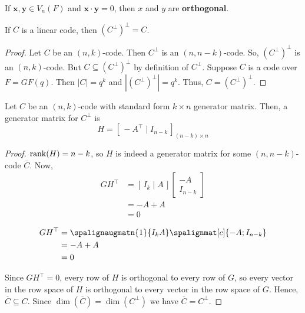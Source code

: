 
\begin{defbox}
    \begin{definition}
        If $ \bm{x},\bm{y}\in V_n(F) $ and $ \bm{x}\cdot \bm{y}=0 $, then $ x $ and $ y $
        are \textbf{orthogonal}.
    \end{definition} \end{defbox}

\begin{thmbox}
    \begin{theorem}
        If $ C $ is a linear code, then $ (C^{\perp})^{\perp}=C $.
    \end{theorem} \end{thmbox}

\begin{proof}
    Let $ C $ be an $ (n,k) $-code. Then $ C^{\perp} $ is an $ (n,n-k) $-code.
    So, $ (C^{\perp})^{\perp} $ is an $ (n,k) $-code. But
    $ C\subseteq (C^{\perp})^{\perp} $ by definition of $ C^{\perp} $.
    Suppose $ C $ is a code over $ F=GF(q) $. Then $ |C|=q^k $
    and $ |(C^{\perp})^{\perp}|=q^k $. Thus, $ C=(C^{\perp})^{\perp} $.
\end{proof}

\begin{thmbox}
    \begin{theorem}
        Let $ C $ be an $ (n,k) $-code with standard form $ k\times n $ generator matrix.
        Then, a generator matrix for $ C^{\perp} $ is
        \[ H=\left[ \,-A^{\top}\mid I_{n-k}\, \right]_{(n-k)\times n} \]
    \end{theorem} \end{thmbox}

\begin{proof}
    $ \operatorname{rank}(H)=n-k $, so $ H $ is indeed a generator matrix for some $ (n,n-k) $-code
    $ \overline{C} $. Now,
    \begin{align*}
        GH^{\top}
         & =\left[ \,I_k\mid A\, \right]
        \begin{bmatrix}
            -A \\
            I_{n-k}
        \end{bmatrix}        \\
         & =-A+A                         \\
         & =0
    \end{align*}

    \begin{align*}
        GH^{\top}
         & = \spalignaugmatn{1}{I_{k} A}\spalignmat[c]{-A; I_{n-k}} \\
         & =-A+A                                                    \\
         & =0
    \end{align*}

    Since $ GH^{\top}=0 $, every row of $ H $ is orthogonal to every row of $ G $,
    so every vector in the row space of $ H $ is orthogonal to every vector in
    the row space of $ G $. Hence, $ \overline{C}\subseteq C $. Since
    $ \dim(\overline{C})=\dim(C^{\perp}) $ we have $ \overline{C}=C^{\perp} $.
\end{proof}

